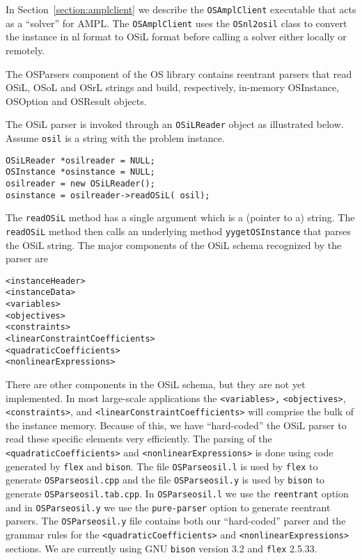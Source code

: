 In Section~\ref{section:amplclient}  we describe the {\tt OSAmplClient}
executable that acts as a ``solver'' for AMPL. The {\tt OSAmplClient} uses the {\tt OSnl2osil} class to convert
the instance in nl format to OSiL format before calling a solver either locally or remotely.


\label{section:osparsers}

The OSParsers component of the OS library contains reentrant parsers that  read OSiL,
OSoL and OSrL strings and build, respectively, in-memory 
OSInstance, OSOption and 
OSResult  objects.


The OSiL parser is invoked through an {\tt OSiLReader} object as illustrated below. Assume {\tt osil} is a string with the problem instance.
\begin{verbatim}
OSiLReader *osilreader = NULL;
OSInstance *osinstance = NULL;
osilreader = new OSiLReader();
osinstance = osilreader->readOSiL( osil);
\end{verbatim}
The {\tt  readOSiL} method  has a single argument which is a (pointer to a) string. 
The {\tt  readOSiL} method then calls an underlying method {\tt yygetOSInstance} that parses the OSiL string. 
The major components of the OSiL schema  recognized by the parser are
\begin{verbatim}
<instanceHeader>
<instanceData>
<variables>
<objectives>
<constraints>
<linearConstraintCoefficients>
<quadraticCoefficients>
<nonlinearExpressions>
\end{verbatim}
There are other components in the OSiL schema, but they are not yet implemented.
In most large-scale applications the {\tt <variables>,} {\tt <objectives>}, {\tt <constraints>}, and {\tt <linearConstraintCoefficients>}
will comprise the bulk of the instance memory.  Because of this, we have ``hard-coded'' the OSiL parser
to read these specific elements very efficiently.
The parsing of the {\tt <quadraticCoefficients>} and {\tt <nonlinearExpressions>} is done using code generated
by {\tt flex} and {\tt bison}. 
\ifdevelop
The file  
{\tt OSParseosil.l} is used by {\tt flex} to generate {\tt OSParseosil.cpp} and the file 
{\tt OSParseosil.y} is used by {\tt bison} to generate {\tt OSParseosil.tab.cpp}.
In {\tt OSParseosil.l} we use the {\tt reentrant} option and in {\tt OSParseosil.y} we use the
{\tt pure-parser} option to generate reentrant parsers. The {\tt OSParseosil.y} file  contains both our
``hard-coded'' parser and the grammar rules for the  {\tt <quadraticCoefficients>} and
{\tt <nonlinearExpressions>} sections.
We are currently using GNU {\tt bison} version 3.2 and {\tt flex} 2.5.33.

